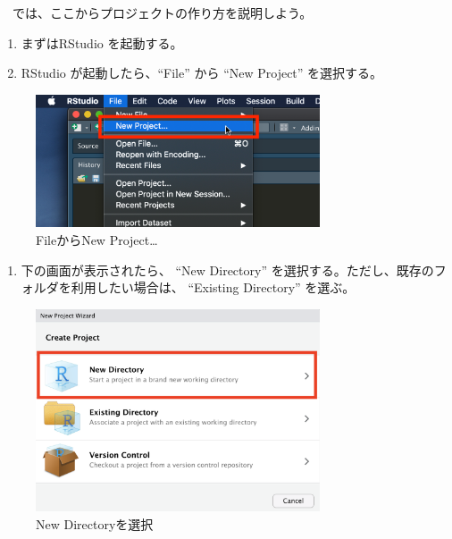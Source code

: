 \documentclass[
  a4paper,
  pandoc,
  ja=standard,
  jafont=haranoaji]{bxjsbook}
\providecommand{\tightlist}{%
  \setlength{\itemsep}{0pt}\setlength{\parskip}{0pt}}
\begin{document}
　では、ここからプロジェクトの作り方を説明しよう。

\begin{enumerate}
\def\labelenumi{\arabic{enumi}.}
\item
  まずはRStudio を起動する。
\item
  RStudio が起動したら、``File'' から ``New Project'' を選択する。
\end{enumerate}

\begin{figure}

{\centering \includegraphics[width=0.75\textwidth,height=\textheight]{./Figs/Rbasic/Project1.png}

}

\caption{\label{fig-rbasic_project1}FileからNew Project\ldots{}}

\end{figure}

\begin{enumerate}
\def\labelenumi{\arabic{enumi}.}
\setcounter{enumi}{2}
\tightlist
\item
  下の画面が表示されたら、 ``New Directory''
  を選択する。ただし、既存のフォルダを利用したい場合は、 ``Existing
  Directory'' を選ぶ。
\end{enumerate}

\begin{figure}

{\centering \includegraphics[width=0.75\textwidth,height=\textheight]{./Figs/Rbasic/Project2.png}

}

\caption{\label{fig-rbasic_project2}New Directoryを選択}

\end{figure}
\end{document}
